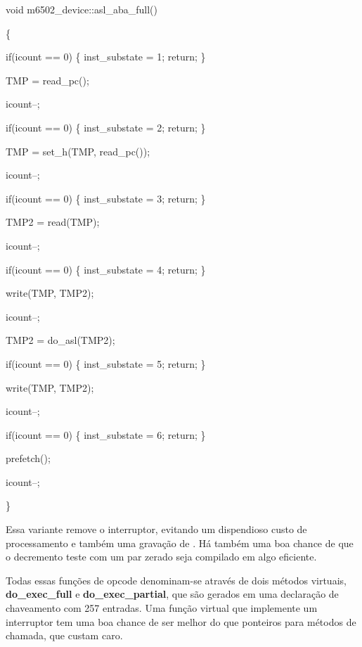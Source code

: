 \documentclass[letterpaper,10pt,brazil]{sphinxmanual}
\begin{document}
\begin{DUlineblock}{0em}
\item[] 
\item[] void m6502\_device::asl\_aba\_full()
\item[] \{
\item[]
\begin{DUlineblock}{\DUlineblockindent}
\item[] if(icount == 0) \{ inst\_substate = 1; return; \}
\item[] TMP = read\_pc();
\item[] icount--;
\item[] if(icount == 0) \{ inst\_substate = 2; return; \}
\item[] TMP = set\_h(TMP, read\_pc());
\item[] icount--;
\item[] if(icount == 0) \{ inst\_substate = 3; return; \}
\item[] TMP2 = read(TMP);
\item[] icount--;
\item[] if(icount == 0) \{ inst\_substate = 4; return; \}
\item[] write(TMP, TMP2);
\item[] icount--;
\item[] TMP2 = do\_asl(TMP2);
\item[] if(icount == 0) \{ inst\_substate = 5; return; \}
\item[] write(TMP, TMP2);
\item[] icount--;
\item[] if(icount == 0) \{ inst\_substate = 6; return; \}
\item[] prefetch();
\item[] icount--;
\end{DUlineblock}
\item[] \}
\item[] 
\end{DUlineblock}

Essa variante remove o interruptor, evitando um dispendioso custo de
processamento e também uma gravação de . Há também uma
boa chance de que o decremento teste com um par zerado seja compilado em
algo eficiente.

Todas essas funções de opcode denominam-se através de dois métodos
virtuais, \textbf{do\_exec\_full} e \textbf{do\_exec\_partial}, que são gerados em uma
declaração de chaveamento com 257 entradas. Uma função virtual que
implemente um interruptor tem uma boa chance de ser melhor do que
ponteiros para métodos de chamada, que custam caro.
\end{document}
